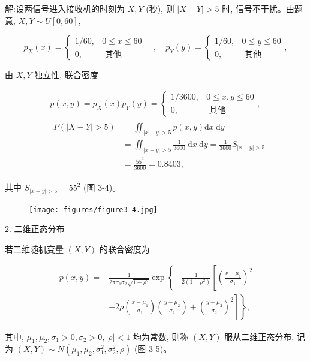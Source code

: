 \documentclass{beamer}
\begin{document}
	\begin{frame}
		解:设两信号进入接收机的时刻为 $X, Y$ (秒), 则 $|X-Y|>5$ 时, 信号不干扰。由题 意, $X, Y \sim U[0,60]$,
		
		$$
		p_{X}(x)=\left\{\begin{array}{cc}
			1 / 60, & 0 \leqslant x \leqslant 60 \\
			0, & \text { 其他 }
		\end{array} \quad, \quad p_{Y}(y)=\left\{\begin{array}{cc}
			1 / 60, & 0 \leqslant y \leqslant 60 \\
			0, & \text { 其他 }
		\end{array},\right.\right.
		$$
		
		由 $X, Y$ 独立性, 联合密度
		
		$$
		\begin{aligned}
			& p(x, y)=p_{X}(x) p_{Y}(y)=\left\{\begin{array}{cc}
				1 / 3600, & 0 \leqslant x, y \leqslant 60 \\
				0, & \text { 其他 }
			\end{array},\right. \\
			& \begin{aligned}
				P(|X-Y|>5) & =\iint_{|x-y|>5} p(x, y) \mathrm{d} x \mathrm{~d} y \\
				& =\iint_{|x-y|>5} \frac{1}{3600} \mathrm{~d} x \mathrm{~d} y=\frac{1}{3600} S_{|x-y|>5} \\
				& =\frac{55^{2}}{3600}=0.8403,
			\end{aligned}
		\end{aligned}
		$$
		
		其中 $S_{|x-y|>5}=55^{2}$ (图 3-4)。
	\end{frame}
	
	\begin{frame}
		\begin{figure}
			\centering
			\texttt{[image: figures/figure3-4.jpg]}
		\end{figure}
	\end{frame}
	
	\begin{frame}
		2. 二维正态分布
		
		若二维随机变量 $(X, Y)$ 的联合密度为
		
		$$
		\begin{aligned}
			p(x, y)= & \frac{1}{2 \pi \sigma_{1} \sigma_{2} \sqrt{1-\rho^{2}}} \exp \left\{-\frac{1}{2\left(1-\rho^{2}\right)}\left[\left(\frac{x-\mu_{1}}{\sigma_{1}}\right)^{2}\right.\right. \\
			& \left.\left.-2 \rho\left(\frac{x-\mu_{1}}{\sigma_{1}}\right)\left(\frac{y-\mu_{2}}{\sigma_{2}}\right)+\left(\frac{y-\mu_{2}}{\sigma_{2}}\right)^{2}\right]\right\},
		\end{aligned}
		$$
		
		其中, $\mu_{1}, \mu_{2}, \sigma_{1}>0, \sigma_{2}>0,|\rho|<1$ 均为常数, 则称 $(X, Y)$ 服从二维正态分布, 记为 $(X, Y) \sim N\left(\mu_{1}, \mu_{2}, \sigma_{1}^{2}, \sigma_{2}^{2}, \rho\right)$ (图 3-5)。
	\end{frame}
	
\end{document}
